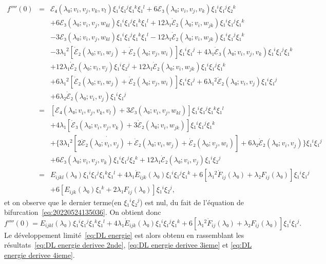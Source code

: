 \documentclass[12pt, final]{amsart}
\theoremstyle{definition}
\begin{document}
\begin{eqnarray*}
 f''''(0) & = & ℰ₄(λ₀ ; v_i, v_j, v_k {, v_l} ) ξ₁^i
 ξ₁^j ξ₁^k ξ₁^l + 6ℰ₃(λ₀ ; v_i, v_j, v_k) ξ₁^i
 ξ₁^j ξ₂^k\\
 & & + 6ℰ₃(λ₀ ; v_i, v_j, w_{k l})
 ξ₁^i ξ₁^j ξ₁^k ξ₁^l + 12 λ₁ \dot{ℰ}₂
 (λ₀ ; v_{i }, w_{j k}) ξ₁^i ξ₁^j ξ₁^k\\
 & & - 3ℰ₃(λ₀ ; v_i, v_j, w_{k l})
 ξ₁^i ξ₁^j ξ₁^k ξ₁^l - 12 λ₁ \dot{ℰ}₂
 (λ₀ ; v_i, w_{j k}) ξ₁^i ξ₁^j ξ₁^k\\
 & & - 3 λ₁^2 [\dot{ℰ}₂(λ₀ ; v_i, w_j)
 + \dot{ℰ}₂(λ₀ ; v_j, w_i)] ξ₁^i ξ₁^j + 4 λ₁
 \dot{ℰ}₃(λ₀ ; v_i, v_j, v_k) ξ₁^i ξ₁^j ξ₁^k\\
 & & + 12 λ₁ \dot{ℰ}₂(λ₀ ; v_i,
 v_j) ξ₁^i ξ₂^j + 12 λ₁ \dot{ℰ}₂(λ₀ ;
 v_i, w_{j k}) ξ₁^i ξ₁^j ξ₁^k\\
 & & + 6 λ₁^2 [\dot{ℰ}₂(λ₀ ; v_i,
 w_j) + \dot{ℰ}₂(λ₀ ; v_j, w_i)] ξ₁^i ξ₁^j + 6
 λ₁^2 \ddot{ℰ}₂(λ₀ ; v_i, v_j) ξ₁^i ξ₁^j\\
 & & + 6 λ₂ \dot{ℰ}₂(λ₀ ; v_i, v_j)
 ξ₁^i ξ₁^j\\
 & = & \left[ ℰ₄(λ₀ ; v_i, v_j, v_k {, v_l} ) +
 3ℰ₃(λ₀ ; v_i, v_j, w_{k l}) \right] ξ₁^i
 ξ₁^j ξ₁^k ξ₁^l\\
 & & + 4 λ₁ [\dot{ℰ}₃(λ₀ ; v_i, v_j,
 v_k) + 3 \dot{ℰ}₂(λ₀ ; v_i, w_{j k})] ξ₁^i
 ξ₁^j ξ₁^k\\
 & & + \{ 3 λ₁^2 [\dot{2 \ddot{ℰ}₂
 (λ₀ ; v_i, v_j) + \dot{ℰ}}₂(λ₀ ; v_i, w_j) +
 \dot{ℰ}₂(λ₀ ; v_j, w_i)] + 6 λ₂
 \dot{ℰ}₂(λ₀ ; v_i, v_j) \} ξ₁^i ξ₁^j\\
 & & + 6ℰ₃(λ₀ ; v_i, v_j, v_k) ξ₁^i ξ₁^j
 ξ₂^k + 12 λ₁ \dot{ℰ}₂(λ₀ ; v_i, v_j)
 ξ₁^i ξ₂^j\\
 & = & E_{i j k l}(λ₀) ξ₁^i ξ₁^j
 ξ₁^k ξ₁^l + 4 λ₁ \dot{E}_{i j k}
 (λ₀) ξ₁^i ξ₁^j ξ₁^k + 6 [λ₁^2 \dot{F}_{i
  j}(λ₀) + λ₂ F_{i j}(λ₀)]
 ξ₁^i ξ₁^j\\
 & & + 6 [E_{i j k}(λ₀) ξ₁^k + 2
 λ₁ F_{i j}(λ₀)] ξ₁^i ξ₂^j,
\end{eqnarray*}
et on observe que le dernier terme(en \(ξ₁^i ξ₂^j\)) est nul, du fait de l'équation de bifurcation~\eqref{eq:20220524135036}. On obtient donc
\begin{equation}
 \label{eq:DL energie derivee 4ieme} f''''(0) = E_{i j k
  l}(λ₀) ξ₁^i ξ₁^j ξ₁^k ξ₁^l + 4 λ₁
 \dot{E}_{i j k}(λ₀) ξ₁^i ξ₁^j ξ₁^k + 6
 [λ₁^2 \dot{F}_{i j}(λ₀) + λ₂ F_{i
  j}(λ₀)] ξ₁^i ξ₁^j .
\end{equation}
Le développement limité~\eqref{eq:DL energie} est alors obtenu en rassemblant les résultats~\eqref{eq:DL energie derivee 2nde}, \eqref{eq:DL energie derivee 3ieme} et \eqref{eq:DL energie derivee 4ieme}.
\end{document}
